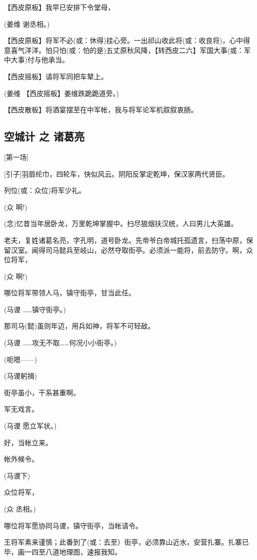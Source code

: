 【西皮原板】我早已安排下令堂母，

(姜维 谢丞相。)

【西皮原板】将军不必(或：休得)挂心旁。一出祁山收此将(或：收良将)，心中得意喜气洋洋。怕只怕(或：怕的是)五丈原秋风降，【转西皮二六】军国大事(或：军中大事)付与他承当。

【西皮摇板】请将军同把车辇上。

(姜维 【西皮摇板】姜维跌跪跪道旁。)

【西皮散板】将酒宴摆至在中军帐，我与将军论军机叙叙衷肠。

\newpage
\hypertarget{ux7a7aux57ceux8ba1-ux4e4b-ux8bf8ux845bux4eae}{%
\subsection{空城计 之
诸葛亮}\label{ux7a7aux57ceux8ba1-ux4e4b-ux8bf8ux845bux4eae}}

{[}第一场{]}

{[}引子{]}羽扇纶巾，四轮车，快似风云。阴阳反掌定乾坤，保汉家两代贤臣。

列位(或：众位)将军少礼。

(众 啊!)

(念)忆昔当年居卧龙，万里乾坤掌握中。扫尽狼烟扶汉统，人曰男儿大英雄。

老夫，复姓诸葛名亮，字孔明，道号卧龙。先帝爷白帝城托孤遗言，扫荡中原，保留汉室。闻得司马懿兵至岐山，必然夺取街亭。必须派一能将，前去防守。啊，众位将军，

(众 啊!)

哪位将军带领人马，镇守街亭，甘当此任。

(马谡 \ldots{}\ldots{}镇守街亭。)

那司马(懿)虽则年迈，用兵如神，将军不可轻敌。

(马谡 \ldots{}\ldots{}攻无不取\ldots{}\ldots{}何况小小街亭。)

(呃嗯------)

(马谡躬揖)

街亭虽小，干系甚重啊。

军无戏言。

(马谡 愿立军状。)

好，当帐立来。

帐外候令。

(马谡下)

众位将军，

(众 丞相。)

哪位将军愿协同马谡，镇守街亭，当帐请令。

王将军素来谨慎；此番到了(或：去至）街亭，必须靠山近水，安营扎寨。扎寨已毕，画一四至八道地理图，速报我知。

